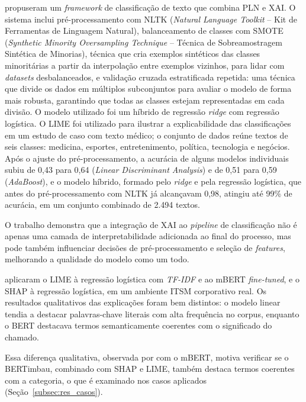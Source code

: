 \documentclass[
    12pt,                %
    openright,           %
    oneside,             %
    a4paper,             %
    english,             %
    brazil               %
]{abntex2}
\begin{document}
 propuseram um \textit{framework} de 
classificação de texto que combina PLN e XAI. O sistema inclui 
pré-processamento com NLTK (\textit{Natural Language Toolkit} -- Kit de Ferramentas de Linguagem Natural), 
balanceamento de classes com SMOTE (\textit{Synthetic Minority Oversampling Technique} -- Técnica de Sobreamostragem Sintética de Minorias), 
técnica que cria exemplos sintéticos das classes minoritárias a partir da interpolação 
entre exemplos vizinhos, para lidar com \textit{datasets} desbalanceados, 
e validação cruzada estratificada repetida: uma técnica que divide 
os dados em múltiplos subconjuntos para avaliar o modelo de forma 
mais robusta, garantindo que todas as classes estejam representadas 
em cada divisão. O modelo utilizado foi um híbrido de regressão 
\textit{ridge} com regressão logística. O LIME foi utilizado para ilustrar a explicabilidade das
classificações em um estudo de caso com texto médico; o
conjunto de dados reúne textos de seis classes: medicina,
esportes, entretenimento, política, tecnologia e negócios. Após o ajuste do pré-processamento, a acurácia de alguns modelos individuais subiu de 0,43 para 0,64 (\textit{Linear Discriminant Analysis}) e de 0,51 para 0,59 (\textit{AdaBoost}), e o modelo híbrido, formado pelo \textit{ridge} e pela regressão logística, que antes do pré-processamento com NLTK já alcançavam 0,98, atingiu até 99\% de acurácia, em um conjunto combinado de 2.494 textos.

O trabalho demonstra que a integração de XAI ao \textit{pipeline} 
de classificação não é apenas uma camada de interpretabilidade 
adicionada ao final do processo, mas pode também influenciar 
decisões de pré-processamento e seleção de \textit{features}, 
melhorando a qualidade do modelo como um todo.

\label{subsubsec:xai_razma}

 aplicaram o LIME à regressão logística com \textit{TF-IDF} e ao mBERT \textit{fine-tuned}, e o SHAP à regressão logística, em um ambiente ITSM corporativo real. Os resultados qualitativos das explicações foram bem distintos: o modelo linear tendia a destacar palavras-chave literais com alta frequência no corpus, enquanto o BERT destacava termos semanticamente coerentes com o significado do chamado.

Essa diferença qualitativa, observada por  com o mBERT, motiva verificar se o BERTimbau, combinado com SHAP e LIME, também destaca termos coerentes com a categoria, o que é examinado nos casos aplicados (Seção~\ref{subsec:res_casos}).
\end{document}
